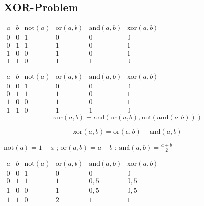 \documentclass{beamer}
\begin{document}
\subsection{XOR-Problem}
\begin{frame}{\insertsection}{\insertsubsection}
$\begin{array}{cccccc}
a	& b  & \mathrm{not}(a) & \mathrm{or}(a,b) & \mathrm{and}(a,b)  & \mathrm{xor}(a,b) \\ 
0	& 0  & 1      & 0 & 0 & 0 \\ 
0	& 1  & 1      & 1 & 0 & 1 \\ 
1	& 0  & 0      & 1 & 0 & 1 \\ 
1	& 1  & 0      & 1 & 1 & 0
\end{array} $
\end{frame}

\begin{frame}{\insertsection}{\insertsubsection}
	$\begin{array}{cccccc}
	a	& b  & \mathrm{not}(a) & \mathrm{or}(a,b) & \mathrm{and}(a,b)  & \mathrm{xor}(a,b) \\ 
	0	& 0  & 1      & 0 & 0 & 0 \\ 
	0	& 1  & 1      & 1 & 0 & 1 \\ 
	1	& 0  & 0      & 1 & 0 & 1 \\ 
	1	& 1  & 0      & 1 & 1 & 0
	\end{array} $
	$$\mathrm{xor}(a,b) = \mathrm{and}(\mathrm{or}(a,b), \mathrm{not}(\mathrm{and}(a,b))) $$
	
	$$\mathrm{xor}(a,b) = \mathrm{or}(a,b) - \mathrm{and}(a,b) $$
\end{frame}

\begin{frame}{\insertsection}{\insertsubsection}


$\mathrm{not}(a) = 1-a$ ; $\mathrm{or}(a,b) = a+b$ ; $\mathrm{and}(a,b) = \frac{a+b}{2}$
\bigskip

	$\begin{array}{cccccc}
	a	& b  & \mathrm{not}(a) & \mathrm{or}(a,b) & \mathrm{and}(a,b)  & \mathrm{xor}(a,b) \\ 
	0	& 0  & 1      & 0 & 0 & 0 \\ 
	0	& 1  & 1      & 1 & 0,5 & 0,5 \\ 
	1	& 0  & 0      & 1 & 0,5 & 0,5 \\ 
	1	& 1  & 0      & 2 & 1 & 1
	\end{array} $


\end{frame}
\end{document}
